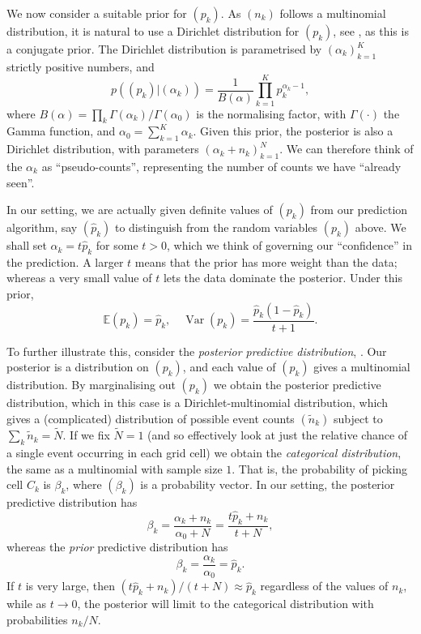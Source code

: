 \documentclass[twoside,a4paper,twocolumn,10pt]{article}
\theoremstyle{plain}
\theoremstyle{definition}
\begin{document}
We now consider a suitable prior for $(p_k)$.  As $(n_k)$ follows a multinomial
distribution, it is natural to use a Dirichlet distribution for $(p_k)$,
see \cite[Section~3.5]{gcsr}, as this is a conjugate prior.  The Dirichlet distribution
is parametrised by $(\alpha_k)_{k=1}^K$ strictly positive numbers, and
\[ p((p_k) | (\alpha_k)) = \frac{1}{B(\alpha)} \prod_{k=1}^K p_k^{\alpha_k-1}, \]
where $B(\alpha) = \prod_k \Gamma(\alpha_k) / \Gamma(\alpha_0)$ is the normalising factor,
with $\Gamma(\cdot)$ the Gamma function, and $\alpha_0 = \sum_{k=1}^K \alpha_k$.
Given this prior, the posterior is also a Dirichlet distribution, with
parameters $(\alpha_k + n_k)_{k=1}^N$.  We can therefore think of the $\alpha_k$ as
``pseudo-counts'', representing the number of counts we have ``already seen''.

In our setting, we are actually given definite values of $(p_k)$ from our prediction
algorithm, say $(\hat p_k)$ to distinguish from the random variables $(p_k)$ above.
We shall set $\alpha_k = t \hat p_k$ for some $t>0$, which we think of governing our
``confidence'' in the prediction.  A larger $t$ means that the prior has more weight than
the data; whereas a very small value of $t$ lets the data dominate the posterior.
Under this prior,
\[ \mathbb E(p_k) = \hat p_k, \quad \operatorname{Var}(p_k)
= \frac{\hat p_k (1 - \hat p_k)}{t+1}. \]

To further illustrate this, consider the \emph{posterior predictive distribution},
\cite[Chapter~1]{gcsr}.  Our posterior is a distribution on $(p_k)$, and each value of
$(p_k)$ gives a multinomial distribution.  By marginalising out $(p_k)$ we obtain the 
posterior predictive distribution, which in this case is a Dirichlet-multinomial distribution,
which gives a (complicated) distribution of possible event counts $(\tilde n_k)$ subject to
$\sum_k \tilde n_k = \tilde N$.  If we fix $\tilde N=1$ (and so effectively look at just
the relative chance of a single event occurring in each grid cell) we obtain the
\emph{categorical distribution}, the same as a multinomial with sample size $1$.  That is,
the probability of picking cell $C_k$ is $\beta_k$, where $(\beta_k)$ is a probability
vector.  In our setting, the posterior predictive distribution has
\[ \beta_k = \frac{\alpha_k + n_k}{\alpha_0+N} = \frac{t\hat p_k+n_k}{t+N}, \]
whereas the \emph{prior} predictive distribution has
\[ \beta_k = \frac{\alpha_k}{\alpha_0} = \hat p_k. \]
If $t$ is very large, then $(t\hat p_k + n_k) / (t+N) \approx \hat p_k$ regardless
of the values of $n_k$, while as $t\rightarrow 0$, the posterior will limit to the
categorical distribution with probabilities $n_k/N$.
\end{document}
